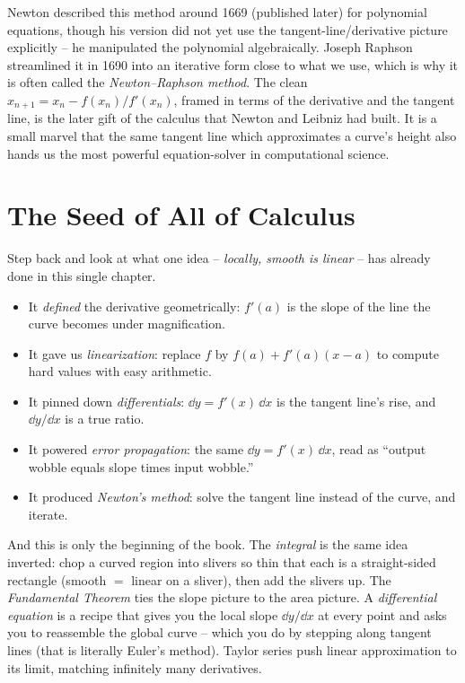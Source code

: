 \begin{historybox}
Newton described this method around 1669 (published later) for polynomial
equations, though his version did not yet use the tangent-line/derivative picture
explicitly -- he manipulated the polynomial algebraically. Joseph Raphson
streamlined it in 1690 into an iterative form close to what we use, which is why
it is often called the \emph{Newton--Raphson method}. The clean
$x_{n+1}=x_n-f(x_n)/f'(x_n)$, framed in terms of the derivative and the tangent
line, is the later gift of the calculus that Newton and Leibniz had built. It is a
small marvel that the same tangent line which approximates a curve's height also
hands us the most powerful equation-solver in computational science.
\end{historybox}

\section{The Seed of All of Calculus}
\label{ch14:seed}

Step back and look at what one idea -- \emph{locally, smooth is linear} -- has
already done in this single chapter.

\begin{itemize}
\item It \emph{defined} the derivative geometrically: $f'(a)$ is the slope of the
line the curve becomes under magnification.
\item It gave us \emph{linearization}: replace $f$ by $f(a)+f'(a)(x-a)$ to compute
hard values with easy arithmetic.
\item It pinned down \emph{differentials}: $\dd y = f'(x)\,\dd x$ is the tangent
line's rise, and $\dd y/\dd x$ is a true ratio.
\item It powered \emph{error propagation}: the same $\dd y = f'(x)\,\dd x$, read
as ``output wobble equals slope times input wobble.''
\item It produced \emph{Newton's method}: solve the tangent line instead of the
curve, and iterate.
\end{itemize}

And this is only the beginning of the book. The \emph{integral} is the same idea
inverted: chop a curved region into slivers so thin that each is a straight-sided
rectangle (smooth $=$ linear on a sliver), then add the slivers up. The
\emph{Fundamental Theorem} ties the slope picture to the area picture. A
\emph{differential equation} is a recipe that gives you the local slope $\dd
y/\dd x$ at every point and asks you to reassemble the global curve -- which you do
by stepping along tangent lines (that is literally Euler's method). Taylor series
push linear approximation to its limit, matching infinitely many derivatives.

